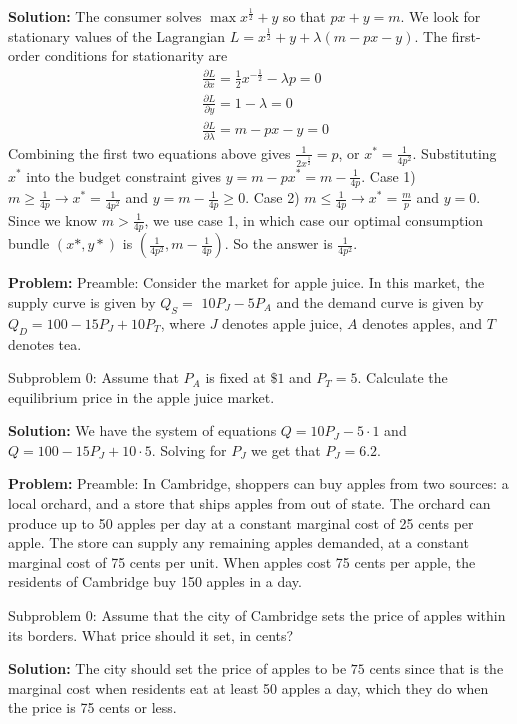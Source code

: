\documentclass[10pt]{article}
\begin{document}
\textbf{Solution:}
The consumer solves $\max x^{\frac{1}{2}}+y$ so that $p x+y=m$. We look for stationary values of the Lagrangian $L=x^{\frac{1}{2}}+y+\lambda(m-p x-y)$. The first-order conditions for stationarity are
\[
  \begin{aligned}
    &\frac{\partial L}{\partial x}=\frac{1}{2} x^{-\frac{1}{2}}-\lambda p=0 \\
    &\frac{\partial L}{\partial y}=1-\lambda=0 \\
    &\frac{\partial L}{\partial \lambda}=m-p x-y=0
  \end{aligned}
\]
Combining the first two equations above gives $\frac{1}{2 x^{\frac{1}{2}}}=p$, or $x^{*}=\frac{1}{4 p^{2}}$. Substituting $x^{*}$ into the budget constraint gives $y=m-p x^{*}=m-\frac{1}{4 p}$.
Case 1) $m \geq \frac{1}{4 p} \longrightarrow x^{*}=\frac{1}{4 p^{2}}$ and $y=m-\frac{1}{4 p} \geq 0$.
Case 2) $m \leq \frac{1}{4 p} \longrightarrow x^{*}=\frac{m}{p}$ and $y=0$.
Since we know $m>\frac{1}{4p}$, we use case 1, in which case our optimal consumption bundle $(x*,y*)$ is $(\frac{1}{4p^2},m-\frac{1}{4p})$.  So the answer is $\boxed{\frac{1}{4p^2}}$.


\textbf{Problem:}
Preamble: Consider the market for apple juice. In this market, the supply curve is given by $Q_{S}=$ $10 P_{J}-5 P_{A}$ and the demand curve is given by $Q_{D}=100-15 P_{J}+10 P_{T}$, where $J$ denotes apple juice, $A$ denotes apples, and $T$ denotes tea.

Subproblem 0: Assume that $P_{A}$ is fixed at $\$ 1$ and $P_{T}=5$. Calculate the equilibrium price in the apple juice market.


\textbf{Solution:}
We have the system of equations $Q=10 P_{J}-5 \cdot 1$ and $Q=100-15 P_{J}+10 \cdot 5$. Solving for $P_{J}$ we get that $P_{J}=\boxed{6.2}$.


\textbf{Problem:}
Preamble: In Cambridge, shoppers can buy apples from two sources: a local orchard, and a store that ships apples from out of state. The orchard can produce up to 50 apples per day at a constant marginal cost of 25 cents per apple. The store can supply any remaining apples demanded, at a constant marginal cost of 75 cents per unit. When apples cost 75 cents per apple, the residents of Cambridge buy 150 apples in a day.

Subproblem 0: Assume that the city of Cambridge sets the price of apples within its borders. What price should it set, in cents?


\textbf{Solution:}
The city should set the price of apples to be $\boxed{75}$ cents since that is the marginal cost when residents eat at least 50 apples a day, which they do when the price is 75 cents or less. 
\end{document}
